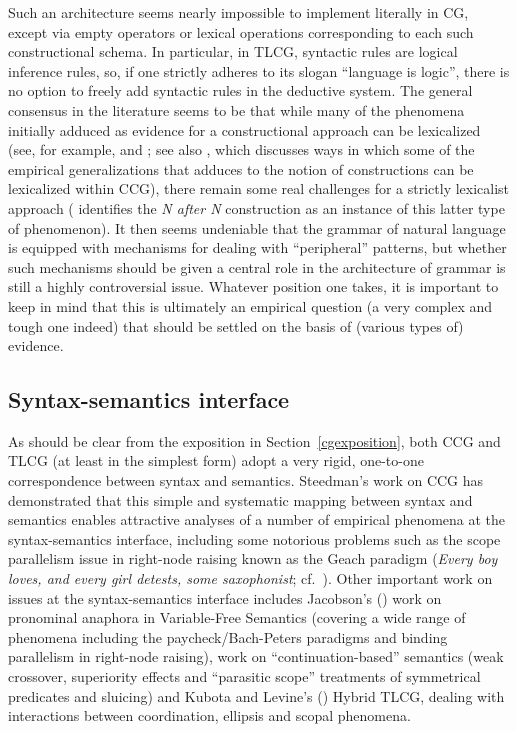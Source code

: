 \documentclass[output=paper
                ,modfonts
 	        ,biblatex
                ,babelshorthands
                ,newtxmath
                ,draftmode
                ,colorlinks, citecolor=brown
]{langscibook}
\begin{document}
Such an architecture seems nearly impossible to implement literally in
CG, except via empty operators or lexical operations corresponding to
each such constructional schema. In particular, in TLCG, syntactic
rules are logical inference rules, so, if one strictly adheres to its
slogan ``language is logic'', there is no option to freely add
syntactic rules in the deductive system. The general consensus in the
literature seems to be that while many of the phenomena initially
adduced as evidence for a constructional approach can be lexicalized
(see, for example,  and ; see also
, which discusses ways in which some of the
empirical generalizations that  adduces to the
notion of constructions can be lexicalized within CCG), there remain
some real challenges for a strictly lexicalist approach
( identifies the \textit{N after N}
construction as an instance of this latter type of phenomenon). It
then seems undeniable that the grammar of natural language is equipped with
mechanisms for dealing with ``peripheral'' patterns, but whether such
mechanisms should be given a central role in the architecture of
grammar is still a highly controversial issue. Whatever position one
takes, it is important to keep in mind that this is ultimately an
empirical question (a very complex and tough one indeed) that
should be settled on the basis of (various types of) evidence.



\subsection{Syntax-semantics interface }

As should be clear from the exposition in Section~\ref{cgexposition},
both CCG and TLCG (at 
least in the simplest form) adopt a very rigid, one-to-one
correspondence between syntax and semantics. Steedman's work on CCG
has demonstrated that 
this simple and systematic mapping between syntax and semantics
enables attractive analyses of
a number of empirical phenomena at the syntax-semantics interface,
including some notorious problems such as the scope parallelism issue
in right-node raising known as
the Geach paradigm (\textit{Every boy loves, and
every girl detests, some saxophonist}; cf.~\citealt[8]{Geach70a}). Other important work on issues
at the syntax-semantics interface includes Jacobson's
(\citeyear{Jacobson1999a,Jacobson2000a}) work on pronominal anaphora
in Variable-Free Semantics (covering a wide range of phenomena
including the paycheck/Bach-Peters paradigms and binding parallelism
in right-node raising),  work on ``continuation-based''
semantics (weak crossover, superiority effects and ``parasitic scope''
treatments of symmetrical predicates and sluicing) and Kubota and
Levine's
(\citeyear{kubota-levine-coord,kubota-levine-pseudo,KubotaLevineBook})
Hybrid TLCG, dealing with interactions between coordination, ellipsis and scopal
phenomena.
\end{document}
